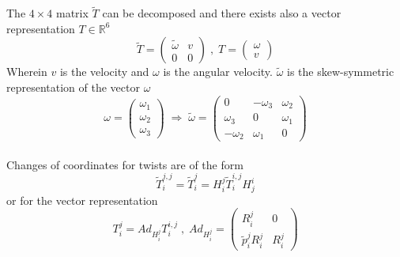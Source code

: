\documentclass[a4paper,twoside, openright,12pt]{report}
\begin{document}
The $4  \times 4$ matrix $\tilde{T} $ can be decomposed and there exists also a vector representation $T\in \mathbb{R}^6$
\[ \tilde{T} = \begin{pmatrix}\tilde{\omega} & v \\ 0 & 0\end{pmatrix} \; , \; T = \begin{pmatrix}\omega \\ v\end{pmatrix} \]
Wherein $v$ is the velocity and $\omega$ is the angular velocity. $\tilde{\omega}$ is the skew-symmetric representation of the vector $\omega$
\begin{equation}\label{EQ:skewsymmetricop}
\omega = \begin{pmatrix}
\omega_1 \\ \omega_2 \\ \omega_3\end{pmatrix} \; \Rightarrow \; \tilde{\omega} = \begin{pmatrix}0 & -\omega_3 & \omega_2 \\ \omega_3 & 0 & \omega_1 \\ -\omega_2 & \omega_1 & 0\end{pmatrix} \end{equation} \\
Changes of coordinates for twists are of the form 
\[\tilde{T}_i^{j,j} = \tilde{T}_i^{j} = H_i^j \tilde{T}_i^{i,j} H_j^i\]
or for the vector representation
\[T_i^{j} = Ad_{H_i^j} T_i^{i,j} \; , \;
Ad_{H_i^j} = \begin{pmatrix}R_i^j & 0 \\ \tilde{p}_i^j R_i^j & R_i^j\end{pmatrix} \]
\end{document}
